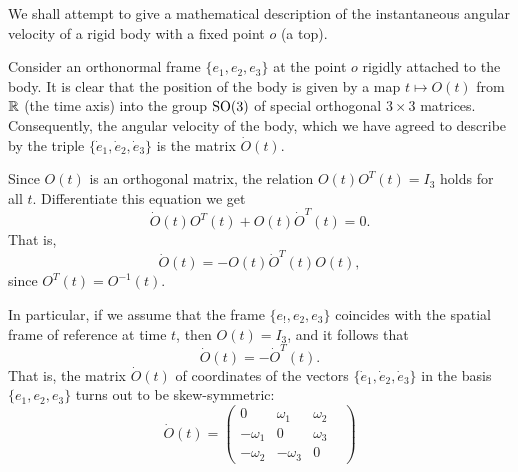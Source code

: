 \begin{example}
We shall attempt to give a mathematical description of the instantaneous angular velocity of a rigid body with a fixed point $o$ (a top).\par
Consider an orthonormal frame $\{e_1,e_2,e_3\}$ at the point $o$ rigidly attached to the body. It is clear that the position of the body is given by a map $t\mapsto O(t)$ from $\mathbb{R}$ (the time axis) 
into the group $\mathrm{SO}(3)$ of special orthogonal $3\times 3$ matrices. Consequently, the angular velocity of the body, which we have agreed to describe by the triple $\{\dot{e}_1,\dot{e}_2,\dot{e}_3\}$ 
is the matrix $\dot{O}(t)$.\par
Since $O(t)$ is an orthogonal matrix, the relation $O(t)O^T(t)=I_3$ holds for all $t$. Differentiate this equation we get
\[\dot{O}(t)O^T(t)+O(t)\dot{O}^T(t)=0.\]
That is,
\[\dot{O}(t)=-O(t)\dot{O}^T(t)O(t),\]
since $O^T(t)=O^{-1}(t)$.\par
In particular, if we assume that the frame $\{e_!,e_2,e_3\}$ coincides with the spatial frame of reference at time $t$, then $O(t)=I_3$, and it follows that
\[\dot{O}(t)=-\dot{O}^T(t).\]
That is, the matrix $\dot{O}(t)$ of coordinates of the vectors $\{\dot{e}_1,\dot{e}_2,\dot{e}_3\}$ in the basis $\{e_1,e_2,e_3\}$ turns out to be skew-symmetric:
\[\dot{O}(t)=\begin{pmatrix}
0&\omega_1&\omega_2&\\
-\omega_1&0&\omega_3\\
-\omega_2&-\omega_3&0
\end{pmatrix}\]
\end{example}

